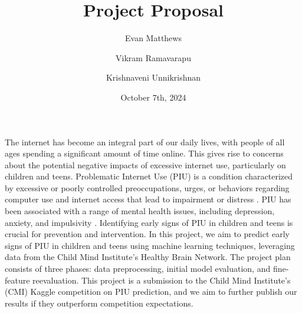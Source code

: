 \documentclass[11pt]{extarticle}
\title{Project Proposal}
\author[1]{Evan Matthews}
\author[1]{Vikram Ramavarapu}
\author[1]{Krishnaveni Unnikrishnan}
\affil[1]{CS 412 Group 6}
\date{October 7th, 2024}
\begin{document}
\maketitle

\pagebreak





The internet has become an integral part of our daily lives, with people of all ages spending a significant amount of time online. This gives rise to concerns about the potential negative impacts of excessive internet use, particularly on children and teens.
Problematic Internet Use (PIU) is a condition characterized by excessive or poorly controlled preoccupations, urges, or behaviors regarding computer use and internet access that lead to impairment or distress \cite{Pettorruso2020-qt}. 
PIU has been associated with a range of mental health issues, including depression, anxiety, and impulsivity \cite{Cash2012-rb}.
Identifying early signs of PIU in children and teens is crucial for prevention and intervention.
In this project, we aim to predict early signs of PIU in children and teens using machine learning techniques, leveraging data from the Child Mind Institute's Healthy Brain Network.
The project plan consists of three phases: data preprocessing, initial model evaluation, and fine-feature reevaluation.
This project is a submission to the Child Mind Institute's (CMI) Kaggle competition on PIU prediction, and we aim to further publish our results if they outperform competition expectations.

\end{document}

